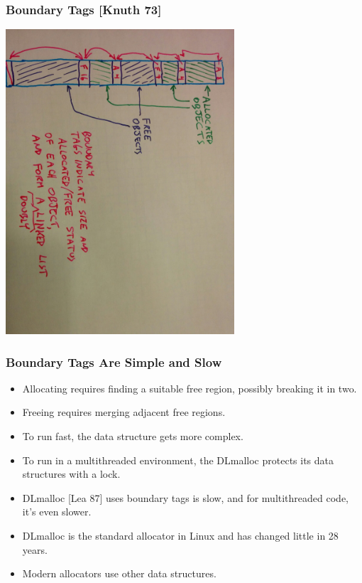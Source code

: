 \documentclass[xcolor=dvipsnames,14pt]{beamer}
\begin{document}
\begin{frame}
\frametitle{Boundary Tags [Knuth 73]}
\hspace*{-.35cm}
\includegraphics[width=3.35in,angle=90]{boundary-tag.jpg}
\end{frame}

\begin{frame}
\frametitle{Boundary Tags Are Simple and Slow}

\begin{itemize}
\item Allocating requires finding a suitable free region, possibly breaking
it in two.

\item Freeing requires merging adjacent free regions.

\item To run fast, the data structure gets more complex.

\item To run in a multithreaded environment, the DLmalloc protects its data
structures with a lock.

\item DLmalloc [Lea 87] uses boundary tags is slow, and for
  multithreaded code, it's even slower. 

\item  DLmalloc is the standard allocator in Linux and has changed little in 28 years.

\item Modern allocators use other data structures.
\end{itemize}
\end{frame}
\end{document}
